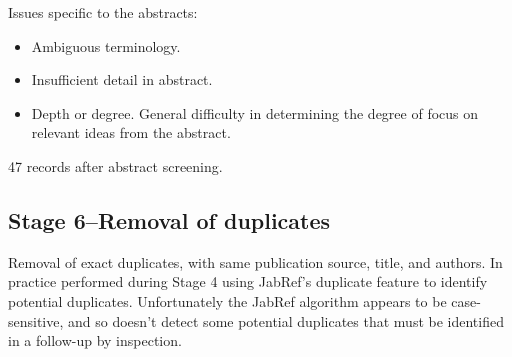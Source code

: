 Issues specific to the abstracts:
\begin{itemize}
	\item Ambiguous terminology.
	\item Insufficient detail in abstract.
	\item Depth or degree. General difficulty in determining the degree of focus on relevant ideas from the abstract.
\end{itemize}

47 records after abstract screening.

\subsection{Stage 6--Removal of duplicates}

Removal of exact duplicates, with same publication source, title, and authors. In practice performed during Stage 4 using JabRef's duplicate feature to identify potential duplicates. Unfortunately the JabRef algorithm appears to be case-sensitive, and so doesn't detect some potential duplicates that must be identified in a follow-up by inspection.

